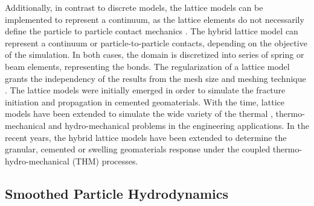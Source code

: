 Additionally, in contrast to discrete models, the lattice models can be implemented to represent a continuum, as the lattice elements do not necessarily define the particle to particle contact mechanics \cite{Rizvietal2019a}. The hybrid lattice model can represent a continuum or particle-to-particle contacts, depending on the objective of the simulation. In both cases, the domain is discretized into series of spring or beam elements, representing the bonds. The regularization of a lattice model grants the independency of the results from the mesh size and meshing technique \cite{Ostojastarzewski2002}. The lattice models were initially emerged in order to simulate the fracture initiation and propagation in cemented geomaterials. With the time, lattice models have been extended to simulate the wide variety of the thermal \cite{Shresthaetal2019, Rizvietal2019d, Rizvietal2016}, thermo-mechanical \cite{Sattarietal2017, Sattarietal2019b} and hydro-mechanical \cite{Grassl2009} problems in the engineering applications. In the recent years, the hybrid lattice models have been extended to determine the granular, cemented or swelling geomaterials response under the coupled thermo-hydro-mechanical (THM) processes.

\subsection{Smoothed Particle Hydrodynamics}

